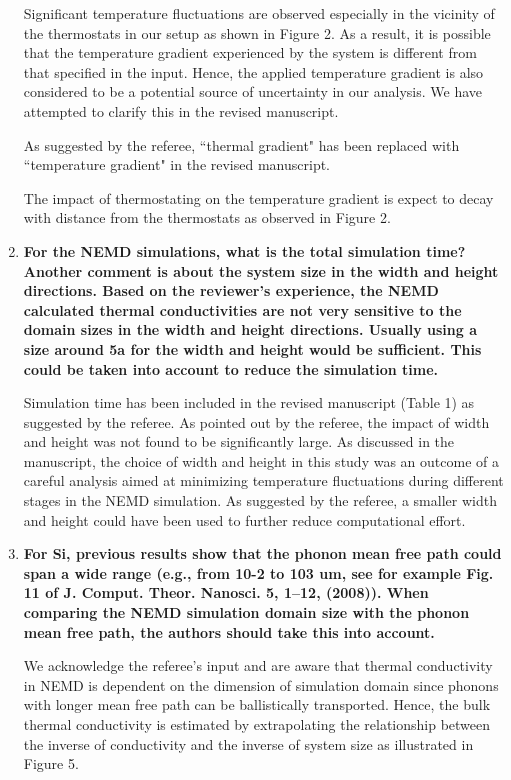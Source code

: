 \documentclass[12pt]{article}
\begin{document}
\begin{enumerate}[leftmargin=*,itemsep=24pt]
Significant temperature fluctuations are observed especially in the vicinity of the thermostats in our setup
as shown in Figure 2. As a result, it is possible that the temperature gradient experienced by the
system is different from that specified in the input. Hence, the applied temperature gradient is also considered
to be a potential source of uncertainty in our analysis. We have attempted to clarify this in the revised
manuscript. 

As suggested by the referee, ``thermal gradient" has been replaced with ``temperature gradient" in the 
revised manuscript. 

The impact of thermostating on the temperature gradient is expect to decay with distance from the thermostats
as observed in Figure 2.  

\item \textbf{For the NEMD simulations, what is the total simulation time? Another comment is about the system size in the width and height directions. Based on the reviewer’s experience, the NEMD calculated thermal conductivities are not very sensitive to the domain sizes in the width and height directions. Usually using a size around 5a for the width and height would be sufficient. This could be taken into account to reduce the simulation time.}

Simulation time has been included in the revised manuscript (Table 1) as suggested by the referee. As pointed
out by the referee, the impact of width and height was not found to be significantly large. 
As discussed in the manuscript, the choice of width and height in this study was an outcome of a careful
analysis aimed at minimizing temperature fluctuations during different stages in the NEMD simulation. As
suggested by the referee, a smaller width and height could have been used to further reduce computational
effort. 

\item \textbf{For Si, previous results show that the phonon mean free path could span a wide range (e.g., from 10-2 to 103 um, see for example Fig. 11 of J. Comput. Theor. Nanosci. 5, 1–12, (2008)). When comparing the NEMD simulation domain size with the phonon mean free path, the authors should take this into account.}

We acknowledge the referee's input and are aware that thermal conductivity in NEMD is dependent on the 
dimension of simulation domain since phonons with longer mean free path can be ballistically transported.
Hence, the bulk thermal conductivity is estimated by extrapolating the relationship between the
inverse of conductivity and the inverse of system size as illustrated in Figure 5. 


\end{enumerate}
\end{document}
